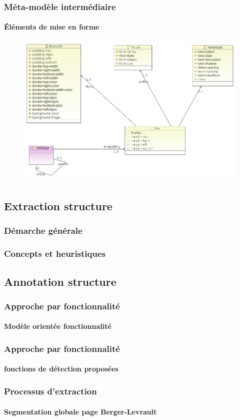 \documentclass[]{beamer}
\begin{document}
\begin{frame}
\frametitle{Méta-modèle intermédiaire}
\framesubtitle{Éléments de mise en forme}
\begin{figure}
\centering
\includegraphics[scale=0.4]{img/metamodele_CSS.png}
\end{figure}
\end{frame}

\subsection{Extraction structure}
\begin{frame}
\frametitle{Démarche générale}
\end{frame}

\begin{frame}
\frametitle{Concepts et heuristiques}
\end{frame}
\subsection{Annotation structure}
\begin{frame}
\frametitle{Approche par fonctionnalité}
\framesubtitle{Modèle orientée fonctionnalité}
\end{frame}

\begin{frame}
\frametitle{Approche par fonctionnalité}
\framesubtitle{fonctions de détection proposées}
\end{frame}


\begin{frame}
	\frametitle{Processus d'extraction}
	\framesubtitle{Segmentation globale page Berger-Levrault}
\end{frame}
\end{document}
